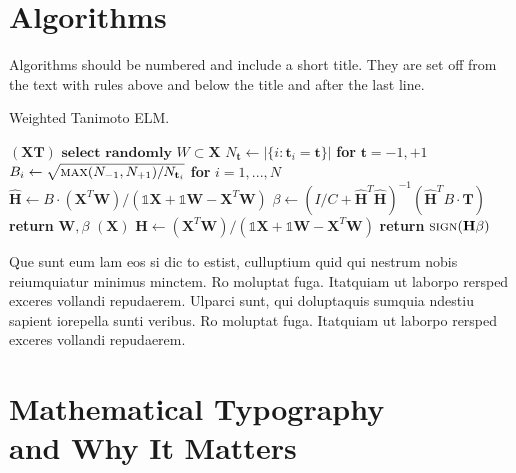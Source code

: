 \documentclass[lettersize,journal]{IEEEtran}
\begin{document}
    \section{Algorithms}
    Algorithms should be numbered and include a short title. They are set off from the text with rules above and below the title and after the last line.

    \begin{algorithm}[H]
        \caption{Weighted Tanimoto ELM.}\label{alg:alg1}
        \begin{algorithmic}
            \STATE
            $(\mathbf{X} \mathbf{T})$
            \STATE \hspace{0.5cm}$ \textbf{select randomly } W \subset \mathbf{X}  $
            \STATE \hspace{0.5cm}$ N_\mathbf{t} \gets | \{ i : \mathbf{t}_i = \mathbf{t} \} | $ \textbf{ for } $ \mathbf{t}= -1,+1 $
            \STATE \hspace{0.5cm}$ B_i \gets \sqrt{ \textsc{max}(N_{-1},N_{+1}) / N_{\mathbf{t}_i} } $ \textbf{ for } $ i = 1,...,N $
            \STATE \hspace{0.5cm}$ \hat{\mathbf{H}} \gets  B \cdot (\mathbf{X}^T\textbf{W})/( \mathbb{1}\mathbf{X} + \mathbb{1}\textbf{W} - \mathbf{X}^T\textbf{W} ) $
            \STATE \hspace{0.5cm}$ \beta \gets \left ( I/C + \hat{\mathbf{H}}^T\hat{\mathbf{H}} \right )^{-1}(\hat{\mathbf{H}}^T B\cdot \mathbf{T})  $
            \STATE \hspace{0.5cm}\textbf{return}  $\textbf{W},  \beta $
            \STATE
            $(\mathbf{X} )$
            \STATE \hspace{0.5cm}$ \mathbf{H} \gets  (\mathbf{X}^T\textbf{W} )/( \mathbb{1}\mathbf{X}  + \mathbb{1}\textbf{W}- \mathbf{X}^T\textbf{W}  ) $
            \STATE \hspace{0.5cm}\textbf{return}  $\textsc{sign}( \mathbf{H} \beta )$
        \end{algorithmic}
        \label{alg1}
    \end{algorithm}

    Que sunt eum lam eos si dic to estist, culluptium quid qui nestrum nobis reiumquiatur minimus minctem. Ro moluptat fuga. Itatquiam ut laborpo rersped exceres vollandi repudaerem. Ulparci sunt, qui doluptaquis sumquia ndestiu sapient iorepella sunti veribus. Ro moluptat fuga. Itatquiam ut laborpo rersped exceres vollandi repudaerem.
    \section{Mathematical Typography \\ and Why It Matters}
\end{document}
